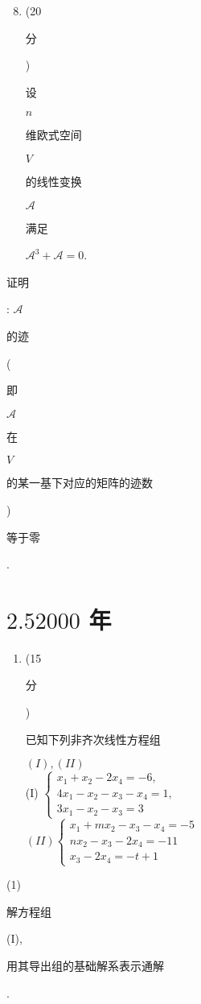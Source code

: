 \documentclass[10pt]{article}
\begin{document}
\begin{enumerate}
  \setcounter{enumi}{7}
  \item (20 \begin{CJK}{UTF8}{mj}分\end{CJK}) \begin{CJK}{UTF8}{mj}设\end{CJK} $n$ \begin{CJK}{UTF8}{mj}维欧式空间\end{CJK} $V$ \begin{CJK}{UTF8}{mj}的线性变换\end{CJK} $\mathscr{A}$ \begin{CJK}{UTF8}{mj}满足\end{CJK} $\mathscr{A}^{3}+\mathscr{A}=0$.
\end{enumerate}
\begin{CJK}{UTF8}{mj}证明\end{CJK}: $\mathscr{A}$ \begin{CJK}{UTF8}{mj}的迹\end{CJK} (\begin{CJK}{UTF8}{mj}即\end{CJK} $\mathscr{A}$ \begin{CJK}{UTF8}{mj}在\end{CJK} $V$ \begin{CJK}{UTF8}{mj}的某一基下对应的矩阵的迹数\end{CJK}) \begin{CJK}{UTF8}{mj}等于零\end{CJK}.

\section{$2.52000$ 年}
\begin{enumerate}
  \item (15 \begin{CJK}{UTF8}{mj}分\end{CJK}) \begin{CJK}{UTF8}{mj}已知下列非齐次线性方程组\end{CJK} $(I),(I I)$\\
(I) $\left\{\begin{array}{l}x_{1}+x_{2}-2 x_{4}=-6, \\ 4 x_{1}-x_{2}-x_{3}-x_{4}=1, \\ 3 x_{1}-x_{2}-x_{3}=3\end{array}\right.$\\
$(I I)\left\{\begin{array}{l}x_{1}+m x_{2}-x_{3}-x_{4}=-5 \\ n x_{2}-x_{3}-2 x_{4}=-11 \\ x_{3}-2 x_{4}=-t+1\end{array}\right.$
\end{enumerate}
(1) \begin{CJK}{UTF8}{mj}解方程组\end{CJK} (I), \begin{CJK}{UTF8}{mj}用其导出组的基础解系表示通解\end{CJK}.
\end{document}
